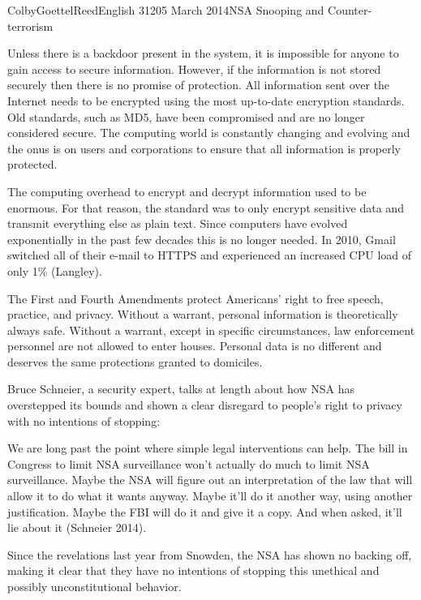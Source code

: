 \documentclass[12pt]{article}
\begin{document}
\begin{mla}{Colby}{Goettel}{Reed}{English 312}{05 March 2014}{NSA Snooping and Counter-terrorism}

Unless there is a backdoor present in the system, it is impossible for anyone to gain access to secure information. However, if the information is not stored securely then there is no promise of protection. All information sent over the Internet needs to be encrypted using the most up-to-date encryption standards. Old standards, such as MD5, have been compromised and are no longer considered secure. The computing world is constantly changing and evolving and the onus is on users and corporations to ensure that all information is properly protected.

The computing overhead to encrypt and decrypt information used to be enormous. For that reason, the standard was to only encrypt sensitive data and transmit everything else as plain text. Since computers have evolved exponentially in the past few decades this is no longer needed. In 2010, Gmail switched all of their e-mail to HTTPS and experienced an increased CPU load of only 1\% (Langley).

The First and Fourth Amendments protect Americans' right to free speech, practice, and privacy. Without a warrant, personal information is theoretically always safe. Without a warrant, except in specific circumstances, law enforcement personnel are not allowed to enter houses. Personal data is no different and deserves the same protections granted to domiciles.

Bruce Schneier, a security expert, talks at length about how NSA has overstepped its bounds and shown a clear disregard to people's right to privacy with no intentions of stopping:
\begin{mlaquote}
    We are long past the point where simple legal interventions can help. The bill in Congress to limit NSA surveillance won't actually do much to limit NSA surveillance. Maybe the NSA will figure out an interpretation of the law that will allow it to do what it wants anyway. Maybe it'll do it another way, using another justification. Maybe the FBI will do it and give it a copy. And when asked, it'll lie about it (Schneier 2014).
\end{mlaquote}
Since the revelations last year from Snowden, the NSA has shown no backing off, making it clear that they have no intentions of stopping this unethical and possibly unconstitutional behavior.


\end{mla}
\end{document}
